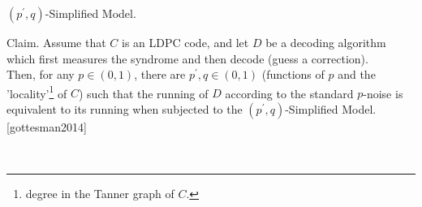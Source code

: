 \documentclass{beamer}
\begin{document}
\begin{frame}{$(p^\prime, q)$-Simplified Model.}
  \begin{block}{Claim.}
    Assume that $C$ is an LDPC code, and let $D$ be a decoding algorithm which first measures the syndrome and then decode (guess a correction).  \ ~\\
Then, for any $p \in (0,1)$, there are $p^{\prime}, q \in (0,1)$ (functions of $p$ and the 'locality'\footnote{degree in the Tanner graph of $C$.} of $C$) such that the running of $D$ according to the standard $p$-noise is equivalent to its running when subjected to the $(p^{\prime}, q)$-Simplified Model. [gottesman2014]
  \end{block}
  
\end{frame}

\begin{frame}
  \begin{figure}[h]
    \begin{subfigure}[h]{0.4\textwidth}

    \label{alg:three}
    \end{subfigure}
    \begin{subfigure}[h]{0.1\textwidth}
      \
    \end{subfigure}
    \begin{subfigure}[h]{0.45\textwidth} 

    \label{fig:location}
    \end{subfigure} 
  \end{figure}

\end{frame}
\end{document}
